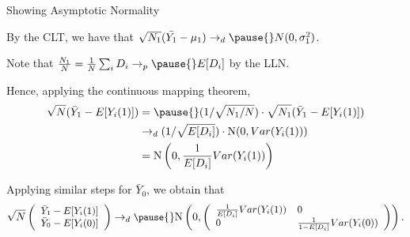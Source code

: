 \documentclass[11pt,english,handout]{beamer}
\newenvironment{wideitemize}{\itemize\addtolength{\itemsep}{10pt}}{\enditemize}
\begin{document}



\begin{frame}{Showing Asymptotic Normality}

\begin{wideitemize}
\item
By the CLT, we have that $\sqrt{N_1} (\bar{Y_1} - \mu_1) \rightarrow_d \pause{} N(0,\sigma_1^2)$.  \pause
	
\item
Note that $\frac{N_1}{N} = \frac{1}{N} \sum_i D_i \rightarrow_p \pause{} E[D_i]$ by the LLN.

\pause
\item
Hence, applying the continuous mapping theorem,
\begin{align*}
\sqrt{N}(\bar{Y}_1 - E[Y_i(1)]) &= \pause{} (1/\sqrt{N_1/N}) \cdot \sqrt{N_1} (\bar{Y}_1 - E[Y_i(1)])\\ 
&\rightarrow_d (1/\sqrt{E[D_i]}) \cdot \mathrm{N}(0,Var(Y_i(1))) \\
& = \mathrm{N}\left(0, \frac{1}{E[D_i]} Var(Y_i(1)) \right)
\end{align*}

\pause
\item
Applying similar steps for $\bar{Y}_0$, we obtain that \pause
	$$\small \sqrt{N} \left(   \begin{array}{c}  \bar{Y}_1 - E[Y_i(1)] \\ 
	  \bar{Y}_0 - E[Y_i(0)] 
\end{array}  \right) \rightarrow_d \pause{} \mathrm{N}\left(0 , \left(\begin{array}{ll} \frac{1}{E[D_i]} Var(Y_i(1)) & 0 \\ 0 & \frac{1}{1-E[D_i]} Var(Y_i(0)) \end{array} \right) \right).$$

\end{wideitemize}
\end{frame}
\end{document}
